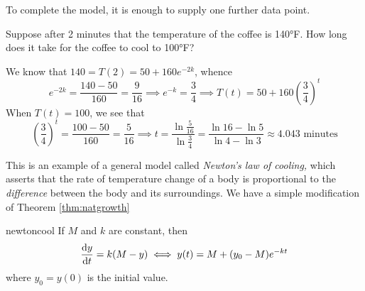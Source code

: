 To complete the model, it is enough to supply one further data point.\par

Suppose after 2 minutes that the temperature of the coffee is \ang{140}F. How long does it take for the coffee to cool to \ang{100}F?\smallbreak

We know that $140=T(2)=50+160e^{-2k}$, whence
\[
	e^{-2k}=\frac{140-50}{160}=\frac 9{16}\implies e^{-k}=\frac 34\implies T(t)=50+160\left(\frac 34\right)^t
\]
When $T(t)=100$, we see that
\[
	\left(\frac 34\right)^t=\frac{100-50}{160}=\frac 5{16}\implies t=\frac{\ln\frac 5{16}}{\ln\frac 34} =\frac{\ln 16-\ln 5}{\ln 4-\ln 3}\approx 4.043\text{ minutes}
\]


\goodbreak

This is an example of a general model called \emph{Newton's law of cooling,} which asserts that the rate of temperature change of a body is proportional to the \emph{difference} between the body and its surroundings. We have a simple modification of Theorem \ref{thm:natgrowth}

\begin{cor}{}{newtoncool}
	If $M$ and $k$ are constant, then
	\[
		\diff[y]{t}=k(M-y)\iff y(t)=M+(y_0-M)e^{-kt}
	\]
	where $y_0=y(0)$ is the initial value.
\end{cor}




